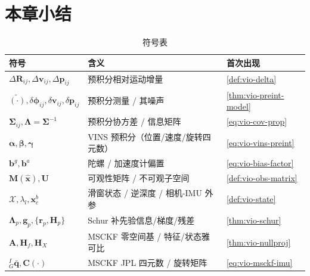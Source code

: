 \section*{本章小结}

\begin{table}[H]\centering\small
\caption{符号表}
\label{tab:vio-symbols}
\begin{tabular}{lll}
\toprule
符号 & 含义 & 首次出现 \\
\midrule
$\Delta\mathbf{R}_{ij},\Delta\mathbf{v}_{ij},\Delta\mathbf{p}_{ij}$ & 预积分相对运动增量 & \cref{def:vio-delta} \\
$\tilde{(\cdot)},\delta\boldsymbol{\phi}_{ij},\delta\mathbf{v}_{ij},\delta\mathbf{p}_{ij}$ & 预积分测量 / 其噪声 & \cref{thm:vio-preint-model} \\
$\boldsymbol{\Sigma}_{ij},\boldsymbol{\Lambda}=\boldsymbol{\Sigma}^{-1}$ & 预积分协方差 / 信息矩阵 & \cref{eq:vio-cov-prop} \\
$\boldsymbol{\alpha},\boldsymbol{\beta},\boldsymbol{\gamma}$ & VINS 预积分（位置/速度/旋转四元数）& \cref{eq:vio-vins-preint} \\
$\mathbf{b}^g,\mathbf{b}^a$ & 陀螺 / 加速度计偏置 & \cref{eq:vio-bias-factor} \\
$\mathbf{M}(\hat{\boldsymbol{x}}),\mathbf{U}$ & 可观性矩阵 / 不可观子空间 & \cref{def:vio-obs-matrix} \\
$\mathcal{X},\lambda_l,\mathbf{x}^b_c$ & 滑窗状态 / 逆深度 / 相机-IMU 外参 & \cref{def:vio-state} \\
$\boldsymbol{\Lambda}_p,\mathbf{g}_p,\{\mathbf{r}_p,\mathbf{H}_p\}$ & Schur 补先验信息/梯度/残差 & \cref{thm:vio-schur} \\
$\mathbf{A},\mathbf{H}_f,\mathbf{H}_X$ & MSCKF 零空间基 / 特征/状态雅可比 & \cref{thm:vio-nullproj} \\
${}^I_G\bar{\mathbf{q}},\mathbf{C}(\cdot)$ & MSCKF JPL 四元数 / 旋转矩阵 & \cref{eq:vio-msckf-imu} \\
\bottomrule
\end{tabular}
\end{table}

